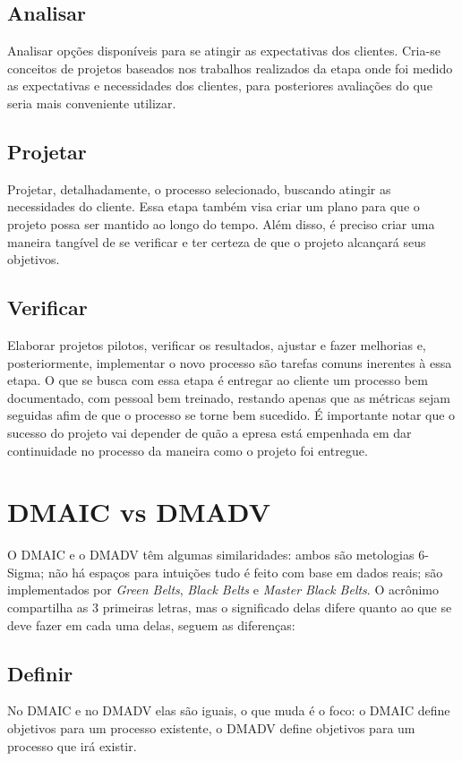 \documentclass{abnt}
\begin{document}
				\subsection {Analisar}
				Analisar opções disponíveis para se atingir as expectativas dos clientes. Cria-se conceitos de projetos baseados 
				nos trabalhos realizados da etapa onde foi medido as expectativas e necessidades dos clientes, 
				para posteriores avaliações do que seria mais conveniente utilizar.
				\subsection {Projetar}
				Projetar, detalhadamente, o processo selecionado, buscando atingir as necessidades do cliente. 
				Essa etapa também visa criar um plano para que o projeto possa ser mantido ao longo do tempo. Além disso, 
				é preciso criar uma maneira tangível de se verificar e ter certeza de que o projeto alcançará seus objetivos.
				\subsection {Verificar}
				Elaborar projetos pilotos, verificar os resultados, ajustar e fazer melhorias
				e, posteriormente, implementar o novo processo são tarefas comuns inerentes à essa etapa. O que se busca 
				com essa etapa é entregar ao cliente um processo bem documentado, com pessoal bem treinado, restando apenas 
				que as métricas sejam seguidas afim de que o processo se torne bem sucedido. 
				É importante notar que o sucesso do projeto vai depender de quão a epresa está empenhada em dar continuidade 
				no processo da maneira como o projeto foi entregue.
			\section {DMAIC vs DMADV}
				O DMAIC e o DMADV têm algumas similaridades: ambos são metologias 6-Sigma; não há espaços para intuições 
				tudo é feito com base em dados reais; são implementados por \textit{Green Belts}, \textit{Black Belts} e \textit{Master Black Belts}.
				O acrônimo compartilha as 3 primeiras letras, mas o significado delas difere quanto ao que se deve fazer em cada uma delas, 
				seguem as diferenças:
				\subsection {Definir}
				No DMAIC e no DMADV elas são iguais, o que muda é o foco: o DMAIC define objetivos para um processo existente, 
				o DMADV define objetivos para um processo que irá existir.
\end{document}
